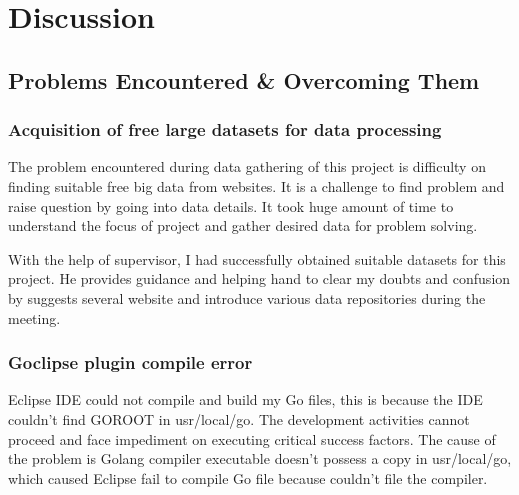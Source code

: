 \chapter{Discussion} 

\label{Chapter7} 


\doublespacing



\section{Problems Encountered \& Overcoming Them}

\subsection{Acquisition of free large datasets for data processing}

The problem encountered during data gathering of this project is difficulty on finding suitable free big data from websites. It is a challenge to find problem and raise question by going into data details. It took huge amount of time to understand the focus of project and gather desired data for problem solving. 

With the help of supervisor, I had successfully obtained suitable datasets for this project. He provides guidance and helping hand to clear my doubts and confusion by suggests several website and introduce various data repositories during the meeting. 

\subsection{Goclipse plugin compile error}

Eclipse IDE could not compile and build my Go files, this is because the IDE couldn’t find GOROOT in usr/local/go. The development activities cannot proceed and face impediment on executing critical success factors. The cause of the problem is Golang compiler executable doesn't possess a copy in usr/local/go, which caused Eclipse fail to compile Go file because couldn't file the compiler. 

